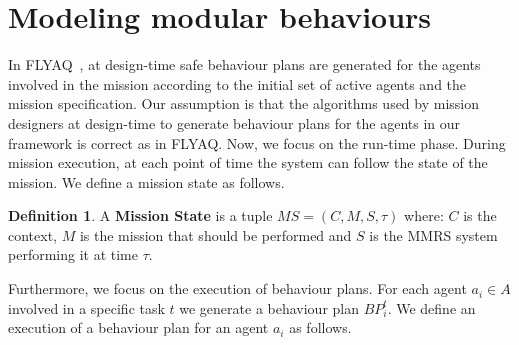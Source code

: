 \documentclass[journal]{IEEEtran}
\theoremstyle{definition}
\newtheorem{definition}{Definition}
\newcommand\patrizio[1]{\nb{Patrizio}{#1}}
\begin{document}

\section{Modeling modular behaviours}













In FLYAQ~\cite{bozhinoski2015flyaq, di2013engineering}, at design-time safe behaviour plans are generated for the agents involved in the mission  according to the initial set of active agents and the mission specification. 
Our assumption is that the algorithms used by mission designers at design-time to generate behaviour plans for the agents in our framework is correct as in FLYAQ. 
Now, we focus on the run-time phase.
During mission execution, at each point of time the system can follow the state of the mission. We define a mission state as follows.

\begin{definition}
A \textbf{Mission State} is a tuple $MS = ( C, M, S, \tau  )$ where: $C$ is the context, $M$ is the mission that should be performed and $S$ is the MMRS system performing it at time $\tau$.
\end{definition}

Furthermore, we focus on the execution of behaviour plans.
For each agent $a_i \in A$ involved in a specific task $t$ we generate a  behaviour plan $BP^t_i$. 
We define an execution of a behaviour plan for an agent $a_i$ as follows.
\end{document}
